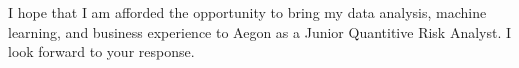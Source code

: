 \documentclass[12pt,a4paper,sans]{moderncv} %
\begin{document}
I hope that I am afforded the opportunity to bring my data analysis, machine learning, and business experience to Aegon as a Junior Quantitive Risk Analyst.
I look forward to your response.



\makeletterclosing %

\clearpage










\end{document}
